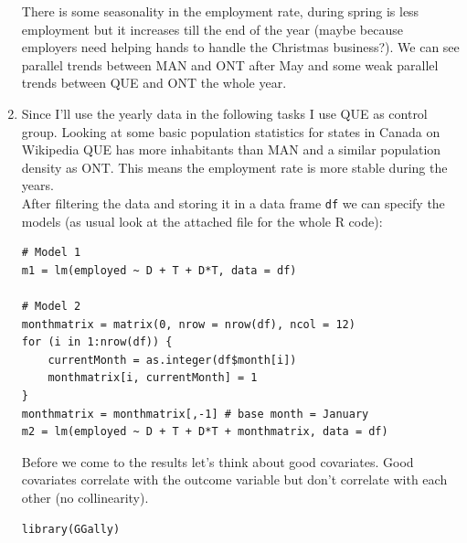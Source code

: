 \documentclass{article}
\begin{document}
\begin{enumerate}[label=(\alph*)]
		There is some seasonality in the employment rate, during spring is less employment but it increases till the end of the year (maybe because employers need helping hands to handle the Christmas business?). We can see parallel trends between MAN and ONT after May and some weak parallel trends between QUE and ONT the whole year.
		\item Since I'll use the yearly data in the following tasks I use QUE as control group. Looking at some basic population statistics for states in Canada on Wikipedia QUE has more inhabitants than MAN and a similar population density as ONT. This means the employment rate is more stable during the years. \\
		After filtering the data and storing it in a data frame \texttt{df} we can specify the models (as usual look at the attached file for the whole R code):
		\begin{lstlisting}[tabsize=2]
# Model 1
m1 = lm(employed ~ D + T + D*T, data = df)

# Model 2
monthmatrix = matrix(0, nrow = nrow(df), ncol = 12)
for (i in 1:nrow(df)) {
	currentMonth = as.integer(df$month[i])
	monthmatrix[i, currentMonth] = 1
}
monthmatrix = monthmatrix[,-1] # base month = January
m2 = lm(employed ~ D + T + D*T + monthmatrix, data = df)
		\end{lstlisting}
		Before we come to the results let's think about good covariates. Good covariates correlate with the outcome variable but don't correlate with each other (no collinearity).
		\begin{lstlisting}[tabsize=2]
library(GGally)


\end{lstlisting}
\end{enumerate}
\end{document}
